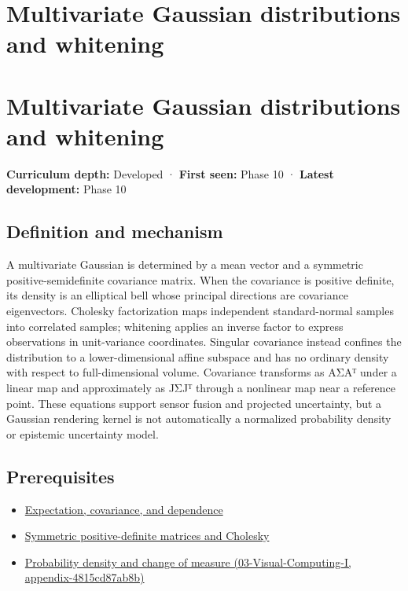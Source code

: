 \hypertarget{appendix-12bbe185dbe5}{}
\section*{Multivariate Gaussian distributions and whitening}
\section{Multivariate Gaussian distributions and whitening}\label{appendix-12bbe185dbe5-multivariate-gaussian-distributions-and-whitening}

\textbf{Curriculum depth:} Developed · \textbf{First seen:} Phase 10 · \textbf{Latest development:} Phase 10

\subsection{Definition and mechanism}\label{appendix-12bbe185dbe5-definition-and-mechanism}

A multivariate Gaussian is determined by a mean vector and a symmetric positive-semidefinite covariance matrix. When the covariance is positive definite, its density is an elliptical bell whose principal directions are covariance eigenvectors. Cholesky factorization maps independent standard-normal samples into correlated samples; whitening applies an inverse factor to express observations in unit-variance coordinates. Singular covariance instead confines the distribution to a lower-dimensional affine subspace and has no ordinary density with respect to full-dimensional volume. Covariance transforms as AΣAᵀ under a linear map and approximately as JΣJᵀ through a nonlinear map near a reference point. These equations support sensor fusion and projected uncertainty, but a Gaussian rendering kernel is not automatically a normalized probability density or epistemic uncertainty model.

\subsection{Prerequisites}\label{appendix-12bbe185dbe5-prerequisites}

\begin{itemize}
\tightlist
\item
  \hyperref[appendix-54c383df9992]{Expectation, covariance, and dependence}
\item
  \hyperref[appendix-50d2ea3c9b26]{Symmetric positive-definite matrices and Cholesky}
\item
  \href{../03-Visual-Computing-I/main.pdf\#nameddest=appendix-4815cd87ab8b}{Probability density and change of measure (03-Visual-Computing-I, appendix-4815cd87ab8b)}
\end{itemize}

